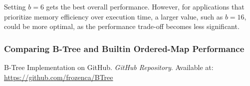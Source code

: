\documentclass[12pt]{article}
\begin{document}
Setting $b = 6$ gets the best overall performance. However, for applications that prioritize memory efficiency over execution time, a larger value, such as $b = 16$, could be more optimal, as the performance trade-off becomes less significant.

\subsubsection*{Comparing B-Tree and Builtin Ordered-Map Performance}



\vspace{2in} %


\begin{thebibliography}{9}
	B-Tree Implementation on GitHub. 
	\textit{GitHub Repository}. 
	Available at: \url{https://github.com/frozenca/BTree}
\end{thebibliography}
	
\end{document}
